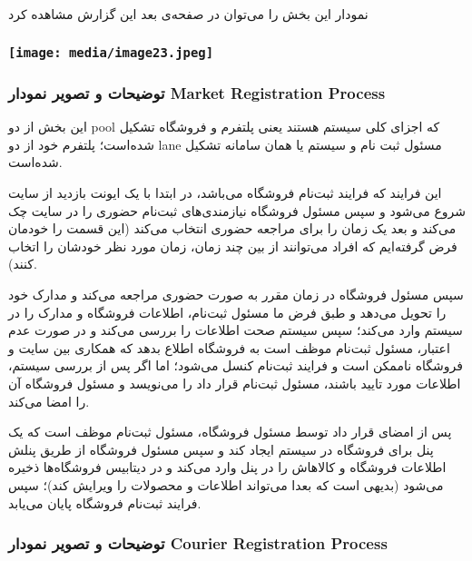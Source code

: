\documentclass[]{article}
\begin{document}
نمودار این بخش را می‌توان در صفحه‌ی بعد این گزارش مشاهده کرد

\subsubsection{}\label{section-2}

\subsubsection{\texorpdfstring{\protect\texttt{[image: media/image23.jpeg]}}{}}\label{section-3}

\subsubsection{توضیحات و تصویر نمودار Market Registration
Process}\label{ux62aux648ux636ux6ccux62dux627ux62a-ux648-ux62aux635ux648ux6ccux631-ux646ux645ux648ux62fux627ux631-market-registration-process}

این بخش از دو pool که اجزای کلی سیستم هستند یعنی پلتفرم و فروشگاه تشکیل
شده‌است؛ پلتفرم خود از دو lane مسئول ثبت نام و سیستم یا همان سامانه
تشکیل شده‌است.

این فرایند که فرایند ثبت‌نام فروشگاه می‌باشد، در ابتدا با یک ایونت
بازدید از سایت شروع می‌شود و سپس مسئول فروشگاه نیازمندی‌های ثبت‌نام
حضوری را در سایت چک می‌کند و بعد یک زمان را برای مراجعه حضوری انتخاب
می‌کند (این قسمت را خودمان فرض گرفته‌ایم که افراد می‌توانند از بین چند
زمان، زمان مورد نظر خودشان را اتخاب کنند).

سپس مسئول فروشگاه در زمان مقرر به صورت حضوری مراجعه می‌کند و مدارک خود
را تحویل می‌دهد و طبق فرض ما مسئول ثبت‌نام، اطلاعات فروشگاه و مدارک را
در سیستم وارد می‌کند؛ سپس سیستم صحت اطلاعات را بررسی می‌کند و در صورت
عدم اعتبار، مسئول ثبت‌نام موظف است به فروشگاه اطلاع بدهد که همکاری بین
سایت و فروشگاه ناممکن است و فرایند ثبت‌نام کنسل می‌شود؛ اما اگر پس از
بررسی سیستم، اطلاعات مورد تایید باشند، مسئول ثبت‌نام قرار داد را
می‌نویسد و مسئول فروشگاه آن را امضا می‌کند.

پس از امضای قرار داد توسط مسئول فروشگاه، مسئول ثبت‌نام موظف است که یک
پنل برای فروشگاه در سیستم ایجاد کند و سپس مسئول فروشگاه از طریق پنلش
اطلاعات فروشگاه‌ و کالاهاش را در پنل وارد می‌کند و در دیتابیس فروشگاه‌ها
ذخیره می‌شود (بدیهی است که بعدا می‌تواند اطلاعات و محصولات را ویرایش
کند)؛ سپس فرایند ثبت‌نام فروشگاه پایان می‌یابد.

\subsubsection{توضیحات و تصویر نمودار Courier Registration
Process}\label{ux62aux648ux636ux6ccux62dux627ux62a-ux648-ux62aux635ux648ux6ccux631-ux646ux645ux648ux62fux627ux631-courier-registration-process}
\end{document}
